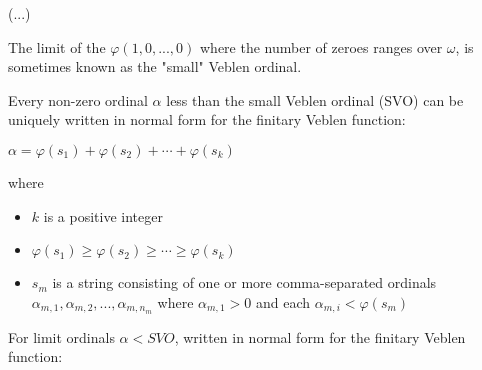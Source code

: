 \documentclass[10pt]{article}
\begin{document}
(...)

The limit of the \(\varphi(1,0,...,0)\) where the number of zeroes ranges over \( \omega \), is sometimes known as the "small" Veblen ordinal.

Every non-zero ordinal \(\alpha\) less than the small Veblen ordinal (SVO) can be uniquely written in normal form for the finitary Veblen function:

\(\alpha =\varphi (s_{1})+\varphi (s_{2})+\cdots +\varphi (s_{k})\)

where

\begin{itemize}
     \setlength{\itemsep}{1pt}
     \setlength{\parskip}{0pt}
     \setlength{\parsep}{0pt}

\item \(k\) is a positive integer
\item \(\varphi (s_{1})\geq \varphi (s_{2})\geq \cdots \geq \varphi (s_{k})\)
\item \(s_{m}\) is a string consisting of one or more comma-separated ordinals \(\alpha _{m,1},\alpha _{m,2},...,\alpha _{m,n_{m}}\) where \(\alpha _{m,1}>0\) and each \(\alpha _{m,i}<\varphi (s_{m})\)

\end{itemize} 

For limit ordinals \(\alpha<SVO\), written in normal form for the finitary Veblen function:
\end{document}
